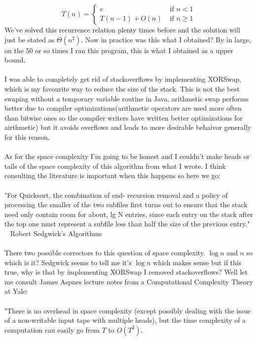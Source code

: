 \documentclass[paper=a4,fontsize=11pt]{article}
\begin{document}
\[
T(n) = \left\{
\begin{array}{cl}
c & \textrm{ if } n < 1\\
T(n - 1) + O(n) & \textrm{ if } n \geq 1
\end{array}
\right.
\]
We've solved this recurrence relation plenty times before and the solution will just be stated as $\Theta(n^2)$. Now in practice was this what I obtained? By in large, on the 50 or so times I ran this program, this is what I obtained as a upper bound.\\\\
I was able to completely get rid of stackoverflows by implementing XORSwap, which is my favourite way to reduce the size of the stack. This is not the best swaping without a temporary variable routine in Java, arithmetic swap performs better due to compiler optimizations(arithmetic operators are used more often than bitwise ones so the compiler writers have written better optimizations for airthmetic) but it avoids overflows and leads to more desirable behaivor generally for this reason.\\\\
As for the space complexity I'm going to be honest and I couldn't make heads or tails of the space complexity of this algorithm from what I wrote. I think consulting the literature is important when this happens so here we go:\\\\
"For Quicksort, the combination of end- recursion removal and a policy of processing the smaller of the two subfiles first turns out to ensure that the stack need only contain room for about, lg N entries, since each entry on the stack after the top one must represent a subfile less than half the size of the previous entry." ~ Robert Sedgwick's Algorithms\\\\
There two possible correctors to this question of space complexity. $\log{n}$ and $n$ so which is it? Sedgwick seems to tell me it's $\log{n}$ which makes sense but if this true, why is that by implementing XORSwap I removed stackoverflows? Well let me consult James Aspnes lecture notes from a Computational Complexity Theory at Yale:\\\\
"There is no overhead in space complexity (except possibly dealing with the issue of a non-writable input tape with multiple heads), but the time complexity of a computation can easily go from $T$ to $O(T^2)$.\\\\
\end{document}
